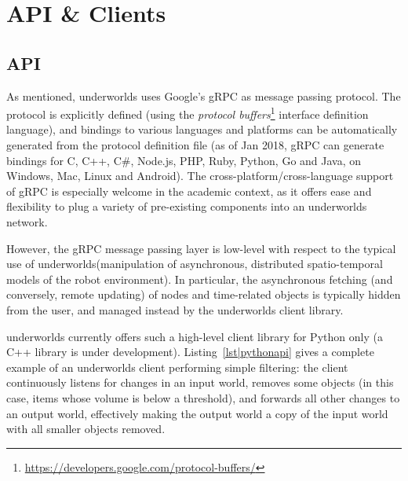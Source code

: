 \documentclass[letterpaper, 10pt, conference]{ieeeconf}
\newcommand{\uwds}{{\sc underworlds}\xspace}
\begin{document}
\section{API \& Clients}
\label{apiclients}

\subsection{API}
\label{api}

As mentioned, \uwds uses Google's gRPC as message passing protocol. The protocol
is explicitly defined (using the \emph{protocol
buffers}\footnote{\url{https://developers.google.com/protocol-buffers/}}
interface definition language), and bindings to various languages and platforms
can be automatically generated from the protocol definition file (as of Jan
2018, gRPC can generate bindings for C, C++, C\#, Node.js, PHP, Ruby, Python, Go
and Java, on Windows, Mac, Linux and Android).  The cross-platform/cross-language support
of gRPC is especially welcome in the academic context, as it offers ease and
flexibility to plug a variety of pre-existing components into an \uwds network.


However, the gRPC message passing layer is low-level with respect to the typical
use of \uwds (manipulation of asynchronous, distributed spatio-temporal models
of the robot environment). In particular, the asynchronous fetching (and
conversely, remote updating) of nodes and time-related objects is typically
hidden from the user, and managed instead by the \uwds client library.

\uwds currently offers such a high-level client library for Python only (a C++
library is under development).  Listing~\ref{lst|pythonapi} gives a complete
example of an \uwds client performing simple filtering: the client continuously
listens for changes in an input world, removes some objects (in this case, items
whose volume is below a threshold), and forwards all other changes to
an output world, effectively making the output world a copy of the input world
with all smaller objects removed.
\end{document}

